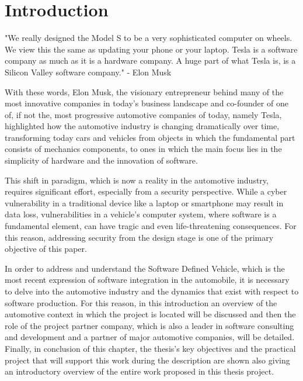 \hypersetup{
    colorlinks=true,
    linkcolor=blue
}

\chapter{Introduction} \label{ch:introduction}
\begin{center}
  "We really designed the Model S to be a very sophisticated computer on wheels. We view this the same as updating your phone or your laptop. Tesla is a software company as much as it is a hardware company. A huge part of what Tesla is, is a Silicon Valley software company."
  - Elon Musk \cite{ElonMusk}
\end{center}
With these words, Elon Musk, the visionary entrepreneur behind many of the most innovative companies in today's business landscape and co-founder of one of, if not the, most progressive automotive companies of today, namely Tesla, highlighted how the automotive industry is changing dramatically over time, transforming today cars and vehicles from objects in which the fundamental part consists of mechanics components, to ones in which the main focus lies in the simplicity of hardware and the innovation of software.

This shift in paradigm, which is now a reality in the automotive industry, requires significant effort, especially from a security perspective. While a cyber vulnerability in a traditional device like a laptop or smartphone may result in data loss, vulnerabilities in a vehicle's computer system, where software is a fundamental element, can have tragic and even life-threatening consequences. For this reason, addressing security from the design stage is one of the primary objective of this paper.

In order to address and understand the Software Defined Vehicle, which is the most recent expression of software integration in the automobile, it is necessary to delve into the automotive industry and the dynamics that exist with respect to software production. For this reason, in this introduction an overview of the automotive context in which the project is located will be discussed and then the role of the project partner company, which is also a leader in software consulting and development and a partner of major automotive companies, will be detailed. Finally, in conclusion of this chapter, the thesis's key objectives and the practical project that will support this work during the description are shown also giving an introductory overview of the entire work proposed in this thesis project.

